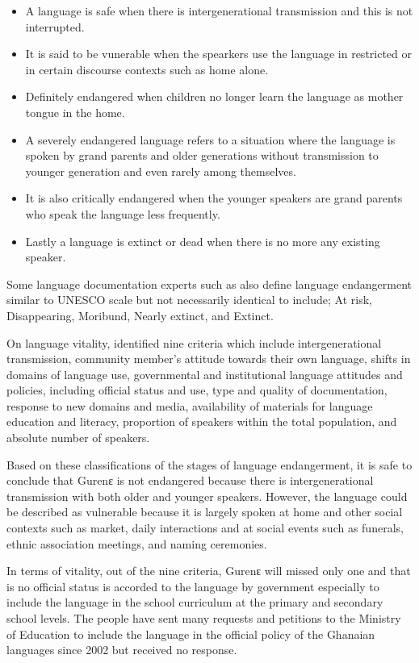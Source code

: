 \documentclass[output=paper,colorlinks,citecolor=brown]{langscibook}
\begin{document}
\begin{itemize}
\item A language is safe when there is intergenerational transmission and this is not interrupted.
\item 	It is said to be vunerable when the spearkers use the language in restricted or in certain discourse contexts such as home alone.
\item 	Definitely endangered when children no longer learn the language as mother tongue in the home.
\item 	A severely endangered language refers to a situation where the language is spoken by grand parents and older generations without transmission to younger generation and even rarely among themselves.
\item 	It is also critically endangered when the younger speakers are grand parents who speak the language less frequently.
\item 	Lastly a language is extinct or dead when there is no more any existing speaker. 
\end{itemize}
Some language documentation experts such as \citet{GrenobleWhaley1998} also define language endangerment similar to UNESCO scale but not necessarily identical to include; At risk, Disappearing, Moribund, Nearly extinct, and Extinct.

On language vitality, \citet[5]{UNESCO2011} identified nine criteria which include intergenerational transmission, community member’s attitude towards their own language, shifts in domains of language use, governmental and institutional language attitudes and policies, including official status and use, type and quality of documentation, response to new domains and media, availability of materials for language education and literacy, proportion of speakers within the total population, and absolute number of speakers.

Based on these classifications of the stages of language endangerment, it is safe to conclude that Gurenɛ is not endangered because there is intergenerational transmission with both older and younger speakers. However, the language could be described as vulnerable because it is largely spoken at home and other social contexts such as market, daily interactions and at social events such as funerals, ethnic association meetings, and naming ceremonies.

In terms of vitality, out of the nine criteria, Gurenԑ will missed only one and that is no official status is accorded to the language by government especially to include the language in the school curriculum at the primary and secondary school levels. The people have sent many requests and petitions to the Ministry of Education to include the language in the official policy of the Ghanaian languages since 2002 but received no response.
\end{document}
